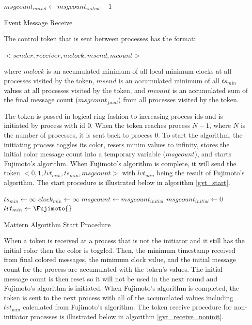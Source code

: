 \documentclass[11pt]{book}
\begin{document}
\begin{algorithm}
\DontPrintSemicolon
\SetAlgoVlined
     {
        $msgcount_{initial} \gets msgcount_{initial} - 1$\;
    }
\caption{Event Message Receive}\label{gvt_event_receive}
\end{algorithm}

\noindent
The control token that is sent between processes has the format:

    $<sender, receiver, mclock, msend, mcount>$

\noindent
where $mclock$ is an accumulated minimum of all local minimum clocks at all processes
visited by the token, $msend$ is an accumulated minimum of all $ts_{min}$ values at all
processes visited by the token, and $mcount$ is an accumulated sum of the final message count
($msgcount_{final}$) from all processes visited by the token.

The token is passed in logical ring fashion to increasing process ids and is initiated by process
with id 0. When the token reaches process $N-1$, where $N$ is the number of processes, it is
sent back to process 0. To start the algorithm, the initiating process toggles its color, resets
minim values to infinity, stores the initial color message count into a temporary variable
($msgcount$), and starts Fujimoto's algorithm. When Fujimoto's algorithm is complete, it will
send the token $<0, 1, lvt_{min}, ts_{min}, msgcount>$ with $lvt_{min}$ being the result of
Fujimoto's algorithm. The start procedure is illustrated below in algorithm \ref{gvt_start}.

\begin{algorithm}
\DontPrintSemicolon
\SetAlgoVlined
{}
     
    $ts_{min} \gets \infty$\;
    $clock_{min} \gets \infty$
    $msgcount \gets msgcount_{initial}$\;
    $msgcount_{initial} \gets 0$\;
    $lvt_{min} \gets \Fujimoto{}$\;
    \;
\caption{Mattern Algorithm Start Procedure}\label{gvt_start}
\end{algorithm}

When a token is received at a process that is not the initiator and it still has the initial
color then the color is toggled. Then, the minimum timestamp received from final colored
messages, the minimum clock value, and the initial message count for the process are
accumulated with the token's values. The initial message count is then reset so it will not
be used in the next round and Fujimoto's algorithm is initiated. When Fujimoto's algorithm
is completed, the token is sent to the next process with all of the accumulated values
including $lvt_{min}$ calculated from Fujimoto's algorithm. The token receive procedure for
non-initiator processes is illustrated below in algorithm \ref{gvt_receive_noninit}.
\end{document}
